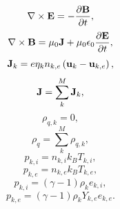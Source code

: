 \documentclass[a4paper,11pt]{report}
\begin{document}
\begin{equation}
    \label{eq:sf_mm_ms_maxwell_1_final}
    \nabla \times \mathbf{E} = -\frac{ \partial \mathbf{B}}{\partial t},
\end{equation}
\begin{equation}
    \label{eq:sf_mm_ms_maxwell_2_final}
    \nabla \times \mathbf{B} = \mu_0 \mathbf{J} + \mu_0 \epsilon_0 \frac{\partial \mathbf{E}}{\partial t},
\end{equation}
\begin{equation}
    \label{eq:sf_mm_ms_curr_density_final}
    \mathbf{J}_k = e \eta_k n_{k,e} \left( \mathbf{u}_k - \mathbf{u}_{k,e} \right),
\end{equation}
\begin{equation}
    \mathbf{J} = \sum_k^M \mathbf{J}_k,
\end{equation}
\begin{equation}
    \label{eq:sf_mm_ms_mass_density_final}
    \rho_{q,k} = 0,
\end{equation}
\begin{equation}
    \rho_q = \sum_k^M \rho_{q,k},
\end{equation}
\begin{equation}
    \label{eq:sf_mm_ms_therm_eos_ion_final}
    p_{k,i} = n_{k,i} k_B T_{k,i},
\end{equation}
\begin{equation}
    \label{eq:sf_mm_ms_therm_eos_elec_final}
    p_{k,e} = n_{k,e} k_B T_{k,e},
\end{equation}
\begin{equation}
    \label{eq:sf_mm_ms_calo_eos_ion_final}
    p_{k,i} = (\gamma - 1) \rho_k e_{k,i},
\end{equation}
\begin{equation}
    \label{eq:sf_mm_ms_calo_eos_elec_final}
    p_{k,e} = (\gamma - 1) \rho_k Y_{k,e} e_{k,e}.
\end{equation}
\end{document}
